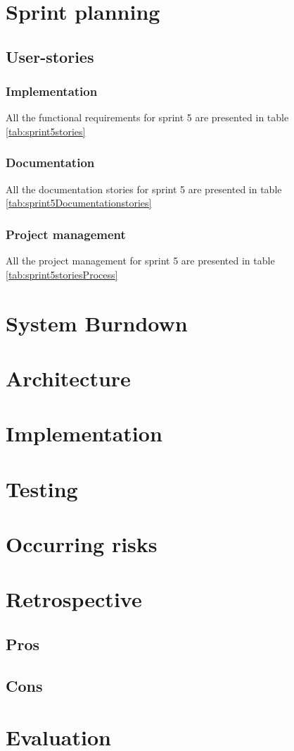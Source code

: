 \section{Sprint planning}
\subsection{User-stories}
\subsubsection*{Implementation}
All the functional requirements for sprint 5 are presented in table \ref{tab:sprint5stories}

\subsubsection*{Documentation}
All the documentation stories for sprint 5 are presented in table \ref{tab:sprint5Documentationstories}

\subsubsection*{Project management}
All the project management for sprint 5 are presented in table \ref{tab:sprint5storiesProcess}
\section{System Burndown}
\section{Architecture}
\section{Implementation}
\section{Testing}
\section{Occurring risks}
\section{Retrospective}
\subsection{Pros}
\subsection{Cons}
\section{Evaluation}